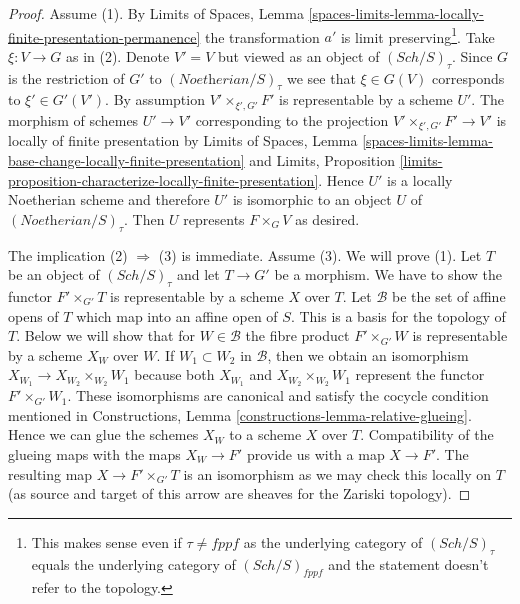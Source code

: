 \documentclass[10pt,a4paper]{amsart}
\theoremstyle{plain}
\theoremstyle{definition}
\theoremstyle{remark}
\numberwithin{equation}{subsection}
\def\Sch{\mathit{Sch}}
\begin{document}
\begin{proof}
Assume (1). By Limits of Spaces, Lemma
\ref{spaces-limits-lemma-locally-finite-presentation-permanence}
the transformation $a'$ is limit preserving\footnote{This
makes sense even if $\tau \not = fppf$ as the underlying
category of $(\Sch/S)_\tau$ equals the underlying category
of $(\Sch/S)_{fppf}$ and the statement doesn't refer to the topology.}.
Take $\xi : V \to G$ as in (2). Denote $V' = V$ but viewed as an
object of $(\Sch/S)_\tau$. Since $G$ is the restriction of
$G'$ to $(\textit{Noetherian}/S)_\tau$ we see that
$\xi \in G(V)$ corresponds to $\xi' \in G'(V')$.
By assumption $V' \times_{\xi', G'} F'$ is representable
by a scheme $U'$. The morphism of schemes $U' \to V'$ corresponding to
the projection $V' \times_{\xi', G'} F' \to V'$ is locally of finite
presentation by
Limits of Spaces, Lemma
\ref{spaces-limits-lemma-base-change-locally-finite-presentation} and
Limits, Proposition
\ref{limits-proposition-characterize-locally-finite-presentation}.
Hence $U'$ is a locally Noetherian scheme and therefore $U'$ is
isomorphic to an object $U$ of $(\textit{Noetherian}/S)_\tau$.
Then $U$ represents $F \times_G V$ as desired.

\medskip\noindent
The implication (2) $\Rightarrow$ (3) is immediate. Assume (3).
We will prove (1). Let $T$ be an object of $(\Sch/S)_\tau$
and let $T \to G'$ be a morphism. We have to show
the functor $F' \times_{G'} T$ is representable by a scheme $X$
over $T$. Let $\mathcal{B}$ be the set of affine opens of
$T$ which map into an affine open of $S$. This is a basis
for the topology of $T$. Below we will show that for $W \in \mathcal{B}$
the fibre product $F' \times_{G'} W$ is representable
by a scheme $X_W$ over $W$. If $W_1 \subset W_2$ in $\mathcal{B}$, then
we obtain an isomorphism $X_{W_1} \to X_{W_2} \times_{W_2} W_1$ because both
$X_{W_1}$ and $X_{W_2} \times_{W_2} W_1$ represent the functor
$F' \times_{G'} W_1$.
These isomorphisms are canonical and satisfy the cocycle condition
mentioned in Constructions, Lemma
\ref{constructions-lemma-relative-glueing}.
Hence we can glue the schemes $X_W$ to a scheme $X$ over $T$.
Compatibility of the glueing maps with the maps
$X_W \to F'$ provide us with a map $X \to F'$.
The resulting map $X \to F' \times_{G'} T$ is an
isomorphism as we may check this locally on $T$ (as source
and target of this arrow are sheaves for the Zariski topology).


\end{proof}
\end{document}
